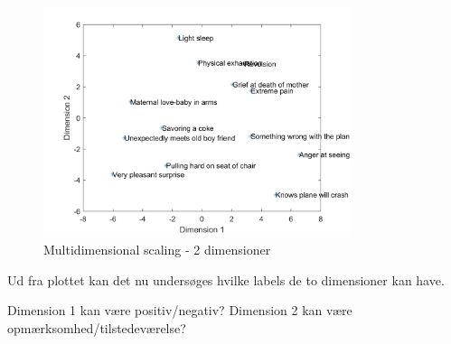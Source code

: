 \begin{figure}[H]
\centering
\includegraphics[width = 0.8\textwidth]{Figure/multidimensional.png} 
\caption{Multidimensional scaling - 2 dimensioner}
\label{fig:MDS}
\end{figure}

\noindent Ud fra plottet kan det nu undersøges hvilke labels de to dimensioner kan have. 

Dimension 1 kan være positiv/negativ? 
Dimension 2 kan være opmærksomhed/tilstedeværelse? 